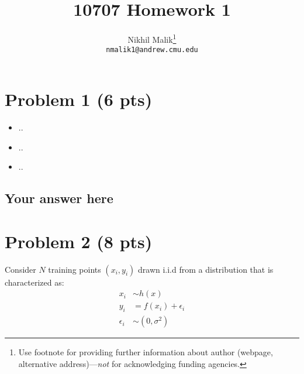 \documentclass{article}
\title{10707 Homework 1}
\author{
  Nikhil Malik\thanks{Use footnote for providing further
    information about author (webpage, alternative
    address)---\emph{not} for acknowledging funding agencies.} \\
  \texttt{nmalik1@andrew.cmu.edu} \\
}
\begin{document}

\maketitle


\section*{Problem 1 (6 pts)}

\begin{itemize}
\item 
.. \\

\item  
.. \\

\item 
..

\end{itemize} 


\subsection*{Your answer here}



\section*{Problem 2 (8 pts)}

Consider $N$ training points $(x_i, y_i)$ drawn i.i.d from a distribution that is characterized as: 
\begin{align}
x_i &\sim h(x) \\
y_i &= f(x_i) + \epsilon_i \\
\epsilon_i &\sim (0, \sigma^2) 
\end{align}
\end{document}
